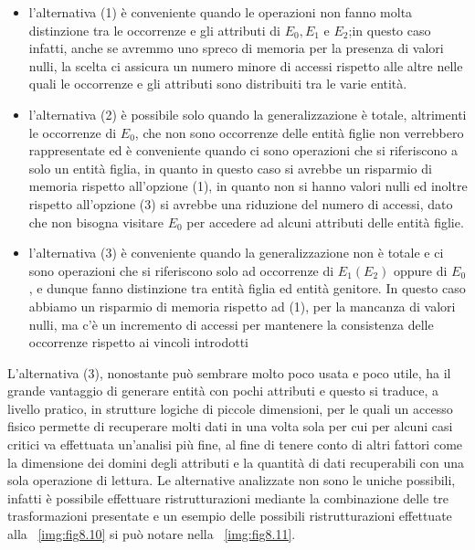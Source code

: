 \begin{itemize}
    \item l'alternativa (1) è conveniente quando le operazioni non fanno molta distinzione tra le occorrenze e gli attributi
          di $E_0, E_1$ e $E_2$;in questo caso infatti, anche se avremmo uno spreco di memoria per la presenza di valori nulli,
          la scelta ci assicura un numero minore di accessi rispetto alle altre nelle quali le occorrenze e gli attributi
          sono distribuiti tra le varie entità.
    \item l'alternativa (2) è possibile solo quando la generalizzazione è totale, altrimenti le occorrenze di $E_0$,
          che non sono occorrenze delle entità figlie non verrebbero rappresentate ed è conveniente quando ci sono 
          operazioni che si riferiscono a solo un entità figlia, in quanto in questo caso si avrebbe un risparmio 
          di memoria rispetto all'opzione (1), in quanto non si hanno valori nulli ed inoltre rispetto all'opzione (3)
          si avrebbe una riduzione del numero di accessi, dato che non bisogna visitare $E_0$ per accedere ad alcuni
          attributi delle entità figlie.
    \item l'alternativa (3) è conveniente quando la generalizzazione non è totale e ci sono operazioni che si riferiscono
          solo ad occorrenze di $E_1(E_2)$ oppure di $E_0$, e dunque fanno distinzione tra entità figlia ed entità genitore.\newline
          In questo caso abbiamo un risparmio di memoria rispetto ad (1), per la mancanza di valori nulli, ma c'è un 
          incremento di accessi per mantenere la consistenza delle occorrenze rispetto ai vincoli introdotti
\end{itemize}
L'alternativa (3), nonostante può sembrare molto poco usata e poco utile, ha il grande vantaggio di generare entità
con pochi attributi e questo si traduce, a livello pratico, in strutture logiche di piccole dimensioni, per le quali
un accesso fisico permette di recuperare molti dati in una volta sola per cui per alcuni casi critici va effettuata
un'analisi più fine, al fine di tenere conto di altri fattori come la dimensione dei domini degli attributi e la quantità
di dati recuperabili con una sola operazione di lettura.\newline
Le alternative analizzate non sono le uniche possibili, infatti è possibile effettuare ristrutturazioni mediante
la combinazione delle tre trasformazioni presentate e un esempio delle possibili ristrutturazioni effettuate alla 
\figurename~\ref{img:fig8.10} si può notare nella \figurename~\ref{img:fig8.11}.





